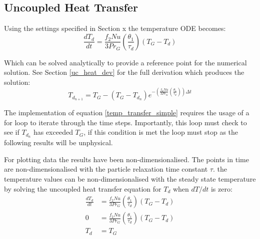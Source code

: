 \documentclass[../Interim_Report_Master]{subfiles}
\begin{document}
\subsection{Uncoupled Heat Transfer}
Using the settings specified in Section x the temperature ODE becomes:
\begin{equation}
\frac{dT_{d}}{dt} = \frac{f_{2}Nu}{3Pr_{G}}\left(\frac{\theta_1}{\tau_d}\right)(T_{G}-T_{d})
\label{temp_transfer_simple}
\end{equation}

Which can be solved analytically to provide a reference point for the numerical solution. See Section \ref{uc_heat_dev} for the full derivation which produces the solution:
\begin{equation}
T_{d_{n+1}} = T_G - (T_G-T_{d_{n}})e^{-\left(\frac{f_{2}Nu}{3Pr_{G}}\left(\frac{\theta_1}{\tau_d}\right)\right)\Delta t}
\label{heat_sol_an}
\end{equation}

%
%

The implementation of equation \ref{temp_transfer_simple} requires the usage of a for loop to iterate through the time steps. Importantly, this loop must check to see if $T_{d_{n}}$ has exceeded $T_G$, if this condition is met the loop must stop as the following results will be unphysical. 

For plotting data the results have been non-dimensionalised. The points in time are non-dimensionalised with the particle relaxation time constant $\tau$. the temperature values can be non-dimensionalised with the steady state temperature by solving the uncoupled heat transfer equation for $T_d$ when $dT/dt$ is zero:
\begin{subequations}
\begin{align}
\frac{dT_{d}}{dt} &= \frac{f_{2}Nu}{3Pr_{G}}\left(\frac{\theta_1}{\tau_d}\right)(T_{G}-T_{d}) \\
0 &= \frac{f_{2}Nu}{3Pr_{G}}\left(\frac{\theta_1}{\tau_d}\right)(T_{G}-T_{d}) \\
T_d &= T_G
\end{align}
\end{subequations}
\end{document}

